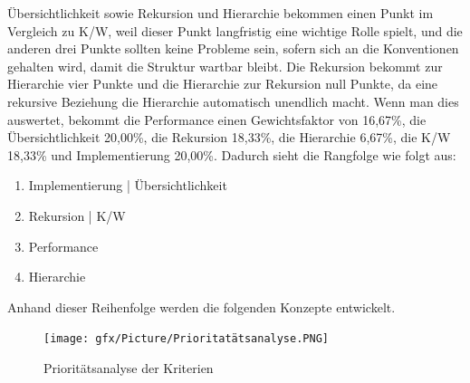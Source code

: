Übersichtlichkeit sowie Rekursion und Hierarchie bekommen einen Punkt im Vergleich zu \ac{K/W}, weil dieser Punkt langfristig eine wichtige Rolle spielt, und die anderen drei Punkte sollten keine Probleme sein, sofern sich an die Konventionen gehalten wird, damit die Struktur wartbar bleibt.
Die Rekursion bekommt zur Hierarchie vier Punkte und die Hierarchie zur Rekursion null Punkte, da eine rekursive Beziehung die Hierarchie automatisch unendlich macht.
\newline
\newline
Wenn man dies auswertet, bekommt die Performance einen Gewichtsfaktor von 16,67\%, die Übersichtlichkeit 20,00\%, die Rekursion 18,33\%, die Hierarchie 6,67\%, die \ac{K/W} 18,33\% und Implementierung 20,00\%.
Dadurch sieht die Rangfolge wie folgt aus:
\begin{enumerate}
	\item Implementierung | Übersichtlichkeit
	\item Rekursion | \ac{K/W}
	\item Performance
	\item Hierarchie
\end{enumerate}
Anhand dieser Reihenfolge werden die folgenden Konzepte entwickelt.
\newpage
\begin{figure}[h!]
\hspace*{-2cm}
 \centering
 \texttt{[image: gfx/Picture/Prioritatätsanalyse.PNG]}
 \caption{Prioritätsanalyse der Kriterien}
 \label{fig:Prio}
\end{figure}

